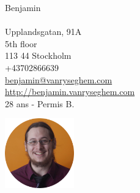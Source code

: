\documentclass{curve}
\title{}
\begin{document}
\begin{minipage}{7cm}
\large
Benjamin \\
\normalsize
\\
Upplandsgatan, 91A\\
5th floor\\
113 44 Stockholm\\
+43702866639\\
\href{mailto:benjamin@vanryseghem.com}{benjamin@vanryseghem.com}\\
\href{http://benjamin.vanryseghem.com}{\underline{http://benjamin.vanryseghem.com}}\\
28 ans - Permis B.
\end{minipage}
\hfill
\begin{minipage}{7cm}
  \begin{flushright}
  \includegraphics[height=3cm]{Moi}
  \end{flushright}
\end{minipage}
\maketitle
\vspace{-1cm}

\end{document}
